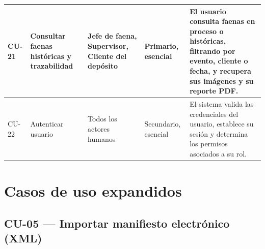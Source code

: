 {\begin{longtable}{L{0.06\textwidth} L{0.18\textwidth} L{0.14\textwidth} L{0.11\textwidth} L{0.41\textwidth}}
CU-21 & Consultar faenas históricas y trazabilidad &
Jefe de faena, Supervisor, Cliente del depósito & Primario, esencial &
El usuario consulta faenas en proceso o históricas, filtrando por evento, cliente o fecha, y
recupera sus imágenes y su reporte PDF. \\
\midrule

CU-22 & Autenticar usuario & Todos los actores humanos & Secundario, esencial &
El sistema valida las credenciales del usuario, establece su sesión y determina los permisos
asociados a su rol. \\

\bottomrule

\end{longtable}
}

\section{Casos de uso expandidos}
\label{sec:cu_expandidos}

\subsection{CU-05 --- Importar manifiesto electrónico (XML)}
\label{subsec:cu05}

